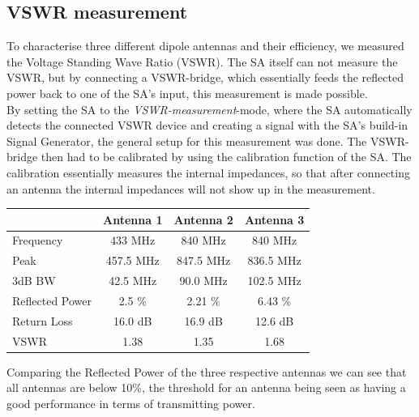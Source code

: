 \subsection{VSWR measurement}
To characterise three different dipole antennas and their efficiency, we measured the Voltage Standing Wave Ratio (VSWR). The SA itself can not measure the VSWR, but by connecting a VSWR-bridge, which essentially feeds the reflected power back to one of the SA's input, this measurement is made possible.\\
By setting the SA to the \textit{VSWR-measurement}-mode, where the SA automatically detects the connected VSWR device and creating a signal with the SA's build-in Signal Generator, the general setup for this measurement was done. The VSWR-bridge then had to be calibrated by using the calibration function of the SA. The calibration essentially measures the internal impedances, so that after connecting an antenna the internal impedances will not show up in the measurement.\\



\begin{center}
\begin{tabular}{l | c | c | c }
	& \textbf{Antenna 1} & \textbf{Antenna 2} & \textbf{Antenna 3}\\
	\hline
	Frequency & 433 MHz & 840 MHz & 840 MHz\\ \hline
	Peak & 457.5 MHz & 847.5 MHz & 836.5 MHz\\ \hline
	3dB BW & 42.5 MHz & 90.0 MHz & 102.5 MHz\\ \hline
	Reflected Power & 2.5 \% & 2.21 \% & 6.43 \% \\ \hline
	Return Loss & 16.0 dB & 16.9 dB & 12.6 dB\\ \hline
	VSWR & 1.38 & 1.35 & 1.68\\ \hline
\end{tabular}
\label{tab:VSWR}
\end{center}

Comparing the Reflected Power of the three respective antennas we can see that all antennas are below 10\%, the threshold for an antenna being seen as having a good performance in terms of transmitting power.


